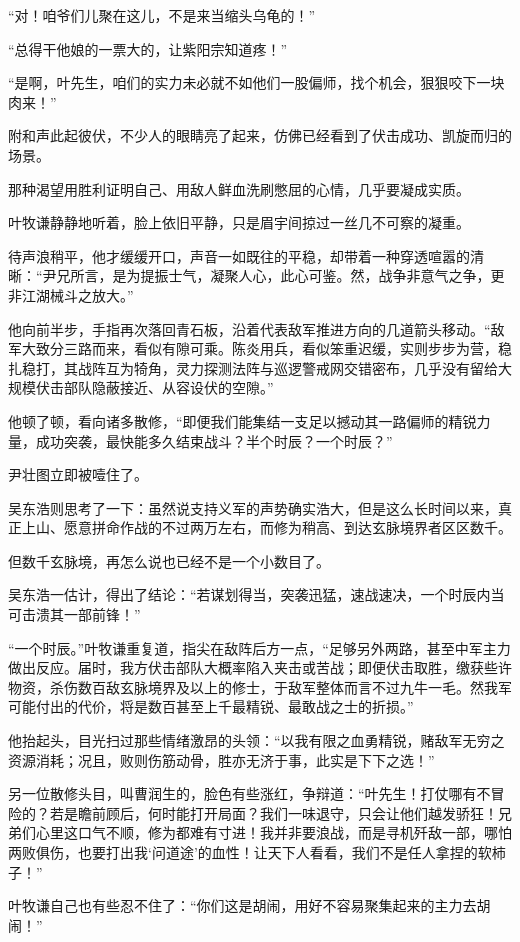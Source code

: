 “对！咱爷们儿聚在这儿，不是来当缩头乌龟的！”

“总得干他娘的一票大的，让紫阳宗知道疼！”

“是啊，叶先生，咱们的实力未必就不如他们一股偏师，找个机会，狠狠咬下一块肉来！”

附和声此起彼伏，不少人的眼睛亮了起来，仿佛已经看到了伏击成功、凯旋而归的场景。

那种渴望用胜利证明自己、用敌人鲜血洗刷憋屈的心情，几乎要凝成实质。

叶牧谦静静地听着，脸上依旧平静，只是眉宇间掠过一丝几不可察的凝重。

待声浪稍平，他才缓缓开口，声音一如既往的平稳，却带着一种穿透喧嚣的清晰：“尹兄所言，是为提振士气，凝聚人心，此心可鉴。然，战争非意气之争，更非江湖械斗之放大。”

他向前半步，手指再次落回青石板，沿着代表敌军推进方向的几道箭头移动。“敌军大致分三路而来，看似有隙可乘。陈炎用兵，看似笨重迟缓，实则步步为营，稳扎稳打，其战阵互为犄角，灵力探测法阵与巡逻警戒网交错密布，几乎没有留给大规模伏击部队隐蔽接近、从容设伏的空隙。”

他顿了顿，看向诸多散修，“即便我们能集结一支足以撼动其一路偏师的精锐力量，成功突袭，最快能多久结束战斗？半个时辰？一个时辰？”

尹壮图立即被噎住了。

吴东浩则思考了一下：虽然说支持义军的声势确实浩大，但是这么长时间以来，真正上山、愿意拼命作战的不过两万左右，而修为稍高、到达玄脉境界者区区数千。

但数千玄脉境，再怎么说也已经不是一个小数目了。

吴东浩一估计，得出了结论：“若谋划得当，突袭迅猛，速战速决，一个时辰内当可击溃其一部前锋！”

“一个时辰。”叶牧谦重复道，指尖在敌阵后方一点，“足够另外两路，甚至中军主力做出反应。届时，我方伏击部队大概率陷入夹击或苦战；即便伏击取胜，缴获些许物资，杀伤数百敌玄脉境界及以上的修士，于敌军整体而言不过九牛一毛。然我军可能付出的代价，将是数百甚至上千最精锐、最敢战之士的折损。”

他抬起头，目光扫过那些情绪激昂的头领：“以我有限之血勇精锐，赌敌军无穷之资源消耗；况且，败则伤筋动骨，胜亦无济于事，此实是下下之选！”

另一位散修头目，叫曹润生的，脸色有些涨红，争辩道：“叶先生！打仗哪有不冒险的？若是瞻前顾后，何时能打开局面？我们一味退守，只会让他们越发骄狂！兄弟们心里这口气不顺，修为都难有寸进！我并非要浪战，而是寻机歼敌一部，哪怕两败俱伤，也要打出我‘问道途’的血性！让天下人看看，我们不是任人拿捏的软柿子！”

叶牧谦自己也有些忍不住了：“你们这是胡闹，用好不容易聚集起来的主力去胡闹！”


